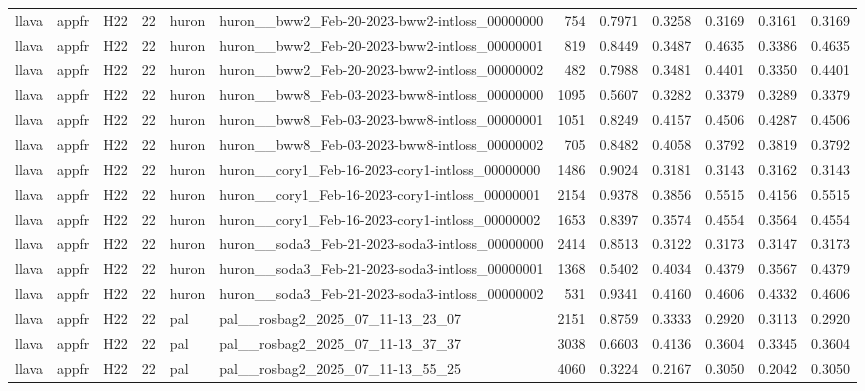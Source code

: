 \begin{table}[tbp]
\begin{tabular}{lllrllrrrrrr}
llava & appfr & H22 & 22 & huron & huron\_\_bww2\_Feb-20-2023-bww2-intloss\_00000000 & 754 & 0.7971 & 0.3258 & 0.3169 & 0.3161 & 0.3169 \\
llava & appfr & H22 & 22 & huron & huron\_\_bww2\_Feb-20-2023-bww2-intloss\_00000001 & 819 & 0.8449 & 0.3487 & 0.4635 & 0.3386 & 0.4635 \\
llava & appfr & H22 & 22 & huron & huron\_\_bww2\_Feb-20-2023-bww2-intloss\_00000002 & 482 & 0.7988 & 0.3481 & 0.4401 & 0.3350 & 0.4401 \\
llava & appfr & H22 & 22 & huron & huron\_\_bww8\_Feb-03-2023-bww8-intloss\_00000000 & 1095 & 0.5607 & 0.3282 & 0.3379 & 0.3289 & 0.3379 \\
llava & appfr & H22 & 22 & huron & huron\_\_bww8\_Feb-03-2023-bww8-intloss\_00000001 & 1051 & 0.8249 & 0.4157 & 0.4506 & 0.4287 & 0.4506 \\
llava & appfr & H22 & 22 & huron & huron\_\_bww8\_Feb-03-2023-bww8-intloss\_00000002 & 705 & 0.8482 & 0.4058 & 0.3792 & 0.3819 & 0.3792 \\
llava & appfr & H22 & 22 & huron & huron\_\_cory1\_Feb-16-2023-cory1-intloss\_00000000 & 1486 & 0.9024 & 0.3181 & 0.3143 & 0.3162 & 0.3143 \\
llava & appfr & H22 & 22 & huron & huron\_\_cory1\_Feb-16-2023-cory1-intloss\_00000001 & 2154 & 0.9378 & 0.3856 & 0.5515 & 0.4156 & 0.5515 \\
llava & appfr & H22 & 22 & huron & huron\_\_cory1\_Feb-16-2023-cory1-intloss\_00000002 & 1653 & 0.8397 & 0.3574 & 0.4554 & 0.3564 & 0.4554 \\
llava & appfr & H22 & 22 & huron & huron\_\_soda3\_Feb-21-2023-soda3-intloss\_00000000 & 2414 & 0.8513 & 0.3122 & 0.3173 & 0.3147 & 0.3173 \\
llava & appfr & H22 & 22 & huron & huron\_\_soda3\_Feb-21-2023-soda3-intloss\_00000001 & 1368 & 0.5402 & 0.4034 & 0.4379 & 0.3567 & 0.4379 \\
llava & appfr & H22 & 22 & huron & huron\_\_soda3\_Feb-21-2023-soda3-intloss\_00000002 & 531 & 0.9341 & 0.4160 & 0.4606 & 0.4332 & 0.4606 \\
llava & appfr & H22 & 22 & pal & pal\_\_rosbag2\_2025\_07\_11-13\_23\_07 & 2151 & 0.8759 & 0.3333 & 0.2920 & 0.3113 & 0.2920 \\
llava & appfr & H22 & 22 & pal & pal\_\_rosbag2\_2025\_07\_11-13\_37\_37 & 3038 & 0.6603 & 0.4136 & 0.3604 & 0.3345 & 0.3604 \\
llava & appfr & H22 & 22 & pal & pal\_\_rosbag2\_2025\_07\_11-13\_55\_25 & 4060 & 0.3224 & 0.2167 & 0.3050 & 0.2042 & 0.3050 \\

\end{tabular}
\end{table}
